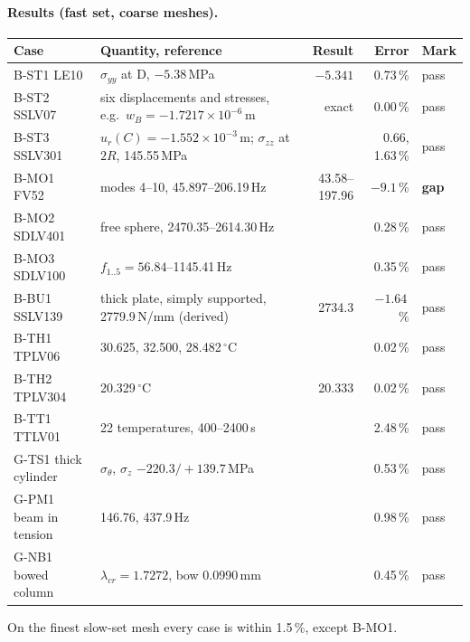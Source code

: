 \paragraph{Results (fast set, coarse meshes).}
\begin{center}
\small
\begin{tabularx}{\linewidth}{@{}lXrrl@{}}
\toprule
Case & Quantity, reference & Result & Error & Mark\\
\midrule
B-ST1 LE10 & $\sigma_{yy}$ at D, $-5.38$\,MPa & $-5.341$ & 0.73\,\% & pass\\
B-ST2 SSLV07 & six displacements and stresses, e.g.\ $w_B=-1.7217\times10^{-6}$\,m & exact & 0.00\,\% & pass\\
B-ST3 SSLV301 & $u_r(C)=-1.552\times10^{-3}$\,m; $\sigma_{zz}$ at $2R$, 145.55\,MPa & & 0.66, 1.63\,\% & pass\\
B-MO1 FV52 & modes 4--10, 45.897--206.19\,Hz & 43.58--197.96 & $-9.1$\,\% & \textbf{gap}\\
B-MO2 SDLV401 & free sphere, 2470.35--2614.30\,Hz & & 0.28\,\% & pass\\
B-MO3 SDLV100 & $f_{1..5}=56.84$--1145.41\,Hz & & 0.35\,\% & pass\\
B-BU1 SSLV139 & thick plate, simply supported, 2779.9\,N/mm (derived) & 2734.3 & $-1.64$\,\% & pass\\
B-TH1 TPLV06 & 30.625, 32.500, 28.482\,$^\circ$C & & 0.02\,\% & pass\\
B-TH2 TPLV304 & 20.329\,$^\circ$C & 20.333 & 0.02\,\% & pass\\
B-TT1 TTLV01 & 22 temperatures, 400--2400\,s & & 2.48\,\% & pass\\
G-TS1 thick cylinder & $\sigma_\theta$, $\sigma_z$ $-220.3/+139.7$\,MPa & & 0.53\,\% & pass\\
G-PM1 beam in tension & 146.76, 437.9\,Hz & & 0.98\,\% & pass\\
G-NB1 bowed column & $\lambda_{cr}=1.7272$, bow 0.0990\,mm & & 0.45\,\% & pass\\
\bottomrule
\end{tabularx}
\end{center}
On the finest slow-set mesh every case is within 1.5\,\%, except B-MO1.

